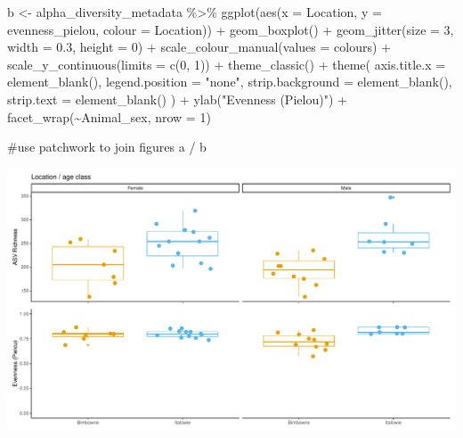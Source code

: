 \documentclass[
  letterpaper,
  DIV=11,
  numbers=noendperiod]{scrartcl}
\newenvironment{Shaded}{\begin{snugshade}}{\end{snugshade}}
\newcommand{\AttributeTok}[1]{\textcolor[rgb]{0.40,0.45,0.13}{#1}}
\newcommand{\CommentTok}[1]{\textcolor[rgb]{0.37,0.37,0.37}{#1}}
\newcommand{\DecValTok}[1]{\textcolor[rgb]{0.68,0.00,0.00}{#1}}
\newcommand{\FloatTok}[1]{\textcolor[rgb]{0.68,0.00,0.00}{#1}}
\newcommand{\FunctionTok}[1]{\textcolor[rgb]{0.28,0.35,0.67}{#1}}
\newcommand{\NormalTok}[1]{\textcolor[rgb]{0.00,0.23,0.31}{#1}}
\newcommand{\OtherTok}[1]{\textcolor[rgb]{0.00,0.23,0.31}{#1}}
\newcommand{\SpecialCharTok}[1]{\textcolor[rgb]{0.37,0.37,0.37}{#1}}
\newcommand{\StringTok}[1]{\textcolor[rgb]{0.13,0.47,0.30}{#1}}
\begin{document}
\begin{Shaded}
\begin{Highlighting}[]
\NormalTok{b }\OtherTok{\textless{}{-}}\NormalTok{ alpha\_diversity\_metadata }\SpecialCharTok{\%\textgreater{}\%}
  \FunctionTok{ggplot}\NormalTok{(}\FunctionTok{aes}\NormalTok{(}\AttributeTok{x =}\NormalTok{ Location, }\AttributeTok{y =}\NormalTok{ evenness\_pielou, }\AttributeTok{colour =}\NormalTok{ Location)) }\SpecialCharTok{+}
  \FunctionTok{geom\_boxplot}\NormalTok{() }\SpecialCharTok{+}
  \FunctionTok{geom\_jitter}\NormalTok{(}\AttributeTok{size =} \DecValTok{3}\NormalTok{, }\AttributeTok{width =} \FloatTok{0.3}\NormalTok{, }\AttributeTok{height =} \DecValTok{0}\NormalTok{) }\SpecialCharTok{+}
  \FunctionTok{scale\_colour\_manual}\NormalTok{(}\AttributeTok{values =}\NormalTok{ colours) }\SpecialCharTok{+}
  \FunctionTok{scale\_y\_continuous}\NormalTok{(}\AttributeTok{limits =} \FunctionTok{c}\NormalTok{(}\DecValTok{0}\NormalTok{, }\DecValTok{1}\NormalTok{)) }\SpecialCharTok{+}
  \FunctionTok{theme\_classic}\NormalTok{() }\SpecialCharTok{+}
  \FunctionTok{theme}\NormalTok{(}
    \AttributeTok{axis.title.x =} \FunctionTok{element\_blank}\NormalTok{(),}
    \AttributeTok{legend.position =} \StringTok{"none"}\NormalTok{,}
    \AttributeTok{strip.background =} \FunctionTok{element\_blank}\NormalTok{(),}
    \AttributeTok{strip.text =} \FunctionTok{element\_blank}\NormalTok{()}
\NormalTok{    ) }\SpecialCharTok{+}
  \FunctionTok{ylab}\NormalTok{(}\StringTok{"Evenness (Pielou)"}\NormalTok{) }\SpecialCharTok{+}
  \FunctionTok{facet\_wrap}\NormalTok{(}\SpecialCharTok{\textasciitilde{}}\NormalTok{Animal\_sex, }\AttributeTok{nrow =} \DecValTok{1}\NormalTok{)}

\CommentTok{\#use patchwork to join figures}
\NormalTok{a }\SpecialCharTok{/}\NormalTok{ b}
\end{Highlighting}
\end{Shaded}

\includegraphics{code_files/figure-pdf/unnamed-chunk-2-1.pdf}
\end{document}
